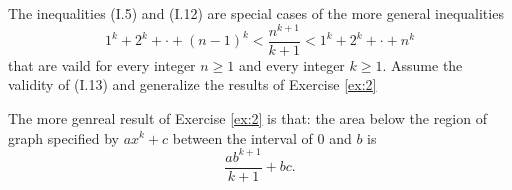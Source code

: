 
\begin{exercise}
  The inequalities (I.5) and (I.12) are special cases of the more general inequalities
  \[
  \tag{I.13}  1^k + 2^k + \cdot + (n - 1)^k < \frac{n^{k+1}}{k+1} < 1^k + 2^k + \cdot + n^k
  \]
  that are vaild for every integer $n \ge 1$ and every integer $k \ge 1$. Assume the validity of (I.13) and generalize the results of Exercise \ref{ex:2}
\end{exercise}

\begin{solution}
  The more genreal result of Exercise \ref{ex:2} is that: the area below the region of 
  graph specified by $ax^k + c$ between the interval of $0$ and $b$ is 
  \[
  \frac{ab^{k+1}}{k+1} + bc.
  \]
\end{solution}


